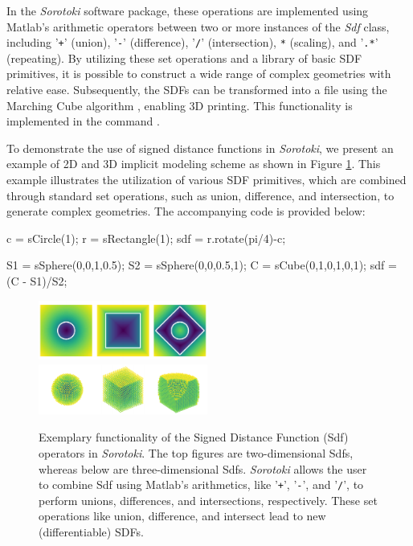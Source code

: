In the \textit{Sorotoki} software package, these operations are implemented using Matlab's arithmetic operators between two or more instances of the \textit{Sdf} class, including '\texttt{+}' (union), '\texttt{-}' (difference), '\texttt{/}' (intersection), \texttt{*} (scaling), and '\texttt{.*}' (repeating). By utilizing these set operations and a library of basic SDF primitives, it is possible to construct a wide range of complex geometries with relative ease. Subsequently, the SDFs can be transformed into a  file using the Marching Cube algorithm \cite{Lorensen1987Aug}, enabling 3D printing. This functionality is implemented in the command . \\

\begin{example}
To demonstrate the use of signed distance functions in \textit{Sorotoki}, we present an example of 2D and 3D implicit modeling scheme as shown in Figure \ref{fig:C5:sdfexample}. This example illustrates the utilization of various SDF primitives, which are combined through standard set operations, such as union, difference, and intersection, to generate complex geometries. The accompanying code is provided below:
\end{example}

\begin{matlabcode}
c   = sCircle(1);
r   = sRectangle(1);
sdf = r.rotate(pi/4)-c;

S1  = sSphere(0,0,1,0.5);
S2  = sSphere(0,0,0.5,1);
C   = sCube(0,1,0,1,0,1);
sdf = (C - S1)/S2;
\end{matlabcode}

\begin{figure}[!t]
\centering
\includegraphics*[width=0.495\textwidth]{./pdf/thesis-figure-6-3-1.pdf}
\includegraphics*[width=0.495\textwidth]{./pdf/thesis-figure-6-3-2.pdf}
%
\caption{Exemplary functionality of the Signed Distance Function (Sdf) operators in \textit{Sorotoki}. The top figures are two-dimensional Sdfs, whereas below are three-dimensional Sdfs. \textit{Sorotoki} allows the user to combine Sdf using Matlab's arithmetics, like '\texttt{+}', '\texttt{-}', and '\texttt{/}', to perform unions, differences, and intersections, respectively. These set operations like union, difference, and intersect lead to new (differentiable) SDFs.\label{fig:C5:sdfexample}}
\vspace{-3mm}
\end{figure}

